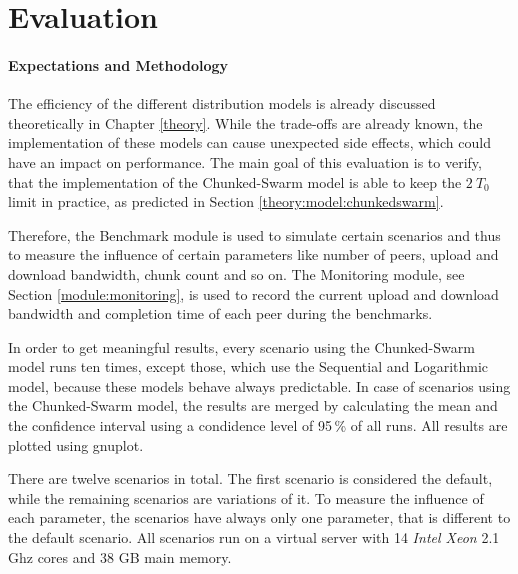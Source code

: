 
\chapter{Evaluation}
\label{evaluation}

\subsubsection{Expectations and Methodology}

The efficiency of the different distribution models is already discussed theoretically in Chapter \ref{theory}. While the trade-offs are already known, the implementation of these models can cause unexpected side effects, which could have an impact on performance. The main goal of this evaluation is to verify, that the implementation of the Chunked-Swarm model is able to keep the $2\:T_0$ limit in practice, as predicted in Section \ref{theory:model:chunkedswarm}.

Therefore, the Benchmark module is used to simulate certain scenarios and thus to measure the influence of certain parameters like number of peers, upload and download bandwidth, chunk count and so on. The Monitoring module, see Section \ref{module:monitoring}, is used to record the current upload and download bandwidth and completion time of each peer during the benchmarks.

In order to get meaningful results, every scenario using the Chunked-Swarm model runs ten times, except those, which use the Sequential and Logarithmic model, because these models behave always predictable. In case of scenarios using the Chunked-Swarm model, the results are merged by calculating the mean and the confidence interval using a condidence level of 95\,\% of all runs. All results are plotted using gnuplot.

There are twelve scenarios in total. The first scenario is considered the default, while the remaining scenarios are variations of it. To measure the influence of each parameter, the scenarios have always only one parameter, that is different to the default scenario. All scenarios run on a virtual server with 14 \emph{Intel Xeon} 2.1 Ghz cores and 38 GB main memory.

